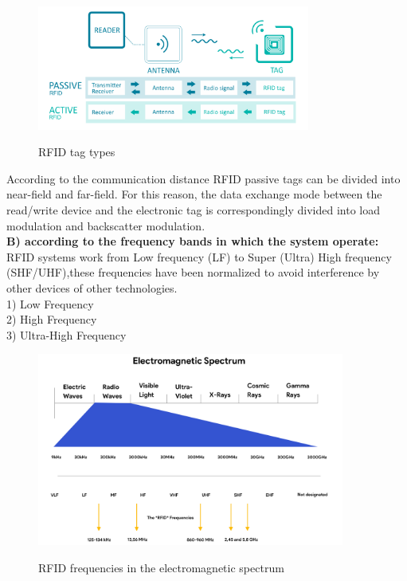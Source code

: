 \begin{figure}[h]
	\centering
	\includegraphics[width=0.8\textwidth,height=0.25\textheight]{images chap1/rfidpa}
	\caption{RFID tag types }\cite{rfidtype}
\end{figure}

According to the communication distance RFID passive tags can be divided into near-field and far-field. 
For this reason, the data exchange mode between the read/write device and the electronic tag is correspondingly divided into load modulation and backscatter modulation.\cite{rfidpascla}\\

\textbf{B) according to the frequency bands in which the system operate:} \\RFID systems work from Low frequency (LF) to Super (Ultra) High frequency (SHF/UHF),these frequencies have been normalized to avoid interference by other devices of other technologies.\cite{duroc2018rfid} \\
1) Low Frequency\\
2) High Frequency\\
3) Ultra-High Frequency
\begin{figure}[h]
	\centering
	
	\includegraphics[width=0.9\textwidth ,height=0.3\textheight]{images chap1/rfidfreqs}
	\caption{RFID frequencies in the electromagnetic spectrum}\cite{rfidfreqs}
\end{figure}


